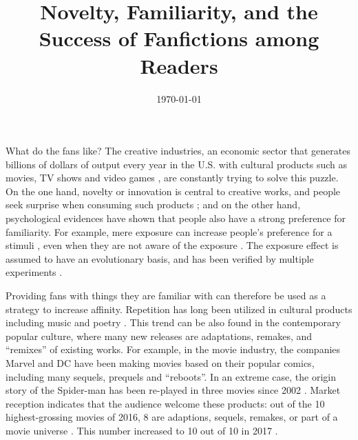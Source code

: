\documentclass[a4paper]{article}
\begin{document}

\title{Novelty, Familiarity, and the Success of Fanfictions among Readers} %
\date{\today}
\maketitle %

What do the fans like? The creative industries, an economic sector that generates billions of dollars of output every year in the U.S. with cultural products such as movies, TV shows and video games \cite{creativeindustries}, are constantly trying to solve this puzzle. On the one hand, novelty or innovation is central to creative works, and people seek surprise when consuming such products \cite{hutter2011infinite}; and on the other hand, psychological evidences have shown that people also have a strong preference for familiarity. For example, mere exposure can increase people's preference for a stimuli \cite{zajonc1968attitudinal}, even when they are not aware of the exposure \cite{kunst1980affective}. The exposure effect is assumed to have an evolutionary basis, and has been verified by multiple experiments \cite{bornstein1989exposure}.

Providing fans with things they are familiar with can therefore be used as a strategy to increase affinity. Repetition has long been utilized in cultural products including music and poetry \cite{huron2013psychological}. This trend can be also found in the contemporary popular culture, where many new releases are adaptations, remakes, and ``remixes'' \cite{manovich2007comes} of existing works. For example, in the movie industry, the companies Marvel and DC have been making movies based on their popular comics, including many sequels, prequels and ``reboots''. In an extreme case, the origin story of the Spider-man has been re-played in three movies since 2002 \cite{spiderman}. Market reception indicates that the audience welcome these products: out of the 10 highest-grossing movies of 2016, 8 are adaptions, sequels, remakes, or part of a movie universe \cite{2016film}. This number increased to 10 out of 10 in 2017 \cite{2017film}. 
\end{document}
